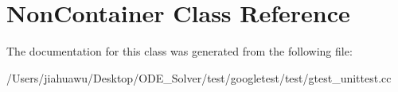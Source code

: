 \hypertarget{class_non_container}{}\section{Non\+Container Class Reference}
\label{class_non_container}


The documentation for this class was generated from the following file\+:\begin{DoxyCompactItemize}
\item 
/\+Users/jiahuawu/\+Desktop/\+O\+D\+E\+\_\+\+Solver/test/googletest/test/gtest\+\_\+unittest.\+cc\end{DoxyCompactItemize}
